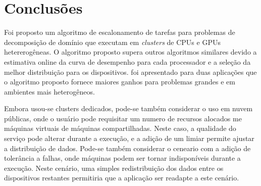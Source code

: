 \section{Conclusões}\label{cap6:conclusao}

Foi proposto um algoritmo de escalonamento de tarefas para problemas de decomposição de domínio que executam em \emph{clusters} de CPUs e GPUs hetererogêneas. O algoritmo proposto supera outros algoritmos similares devido a estimativa online da curva de desempenho para cada  processador e a seleção da melhor distribuição para os dispositivos. foi apresentado para duas aplicações que o algoritmo proposto fornece maiores ganhos para problemas grandes e em ambientes mais heterogêneos.

Embora usou-se clusters dedicados, pode-se também considerar o uso em nuvem públicas, onde o usuário pode requisitar um numero de recursos alocados me máquinas virtuais de máquinas compartilhadas. Neste caso, a qualidade do serviço pode alterar durante a execução, e a adição de um limiar permite ajustar a distribuição de dados. Pode-se também considerar o ceneario com a adição de tolerância a falhas, onde máquinas podem ser tornar indisponíveis durante a execução. Neste cenário, uma simples redistribuição dos dados entre os dispositivos restantes permitiria que a aplicação ser readapte a este cenário.




